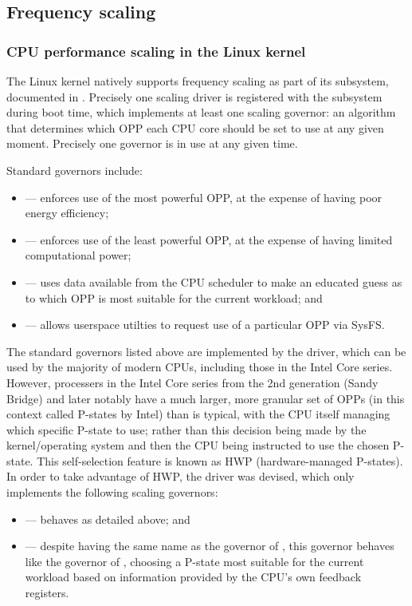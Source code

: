 \subsection{Frequency scaling}

\subsubsection{CPU performance scaling in the Linux kernel}

The Linux kernel natively supports frequency scaling as part of its 
subsystem, documented in \cite{linuxCPUScaling}. Precisely one scaling driver is
registered with the subsystem during boot time, which implements at least one
scaling governor: an algorithm that determines which OPP each CPU core should be
set to use at any given moment. Precisely one governor is in use at any given time.

Standard governors include:
\begin{itemize}
    \item {} — enforces use of the most powerful OPP, at the expense
        of having poor energy efficiency;
    \item {} — enforces use of the least powerful OPP, at the expense of
        having limited computational power;
    \item {} — uses data available from the CPU scheduler to make an
        educated guess as to which OPP is most suitable for the current
        workload; and
    \item {} — allows userspace utilties to request use of a
        particular OPP via SysFS.
\end{itemize}

The standard governors listed above are implemented by the 
driver, which can be used by the majority of modern CPUs, including those in
the Intel Core series. However, processers in the Intel Core series from the
2nd generation (Sandy Bridge) and later notably have a much larger, more
granular set of OPPs (in this context called P-states by Intel) than is
typical,\cite{intelDevManual} with the CPU itself managing which specific
P-state to use; rather than this decision being made by the kernel/operating
system and then the CPU being instructed to use the chosen P-state.
This self-selection feature is known as HWP (hardware-managed P-states).
In order to take advantage of HWP, the  driver was
devised,\cite{linuxIntelPState} which only implements the following scaling
governors:
\begin{itemize}
    \item {} — behaves as detailed above; and
    \item {} — despite having the same name as the 
        governor of , this governor behaves like the 
        governor of , choosing a P-state most suitable for the
        current workload based on information provided by the CPU's own
        feedback registers.
\end{itemize}


